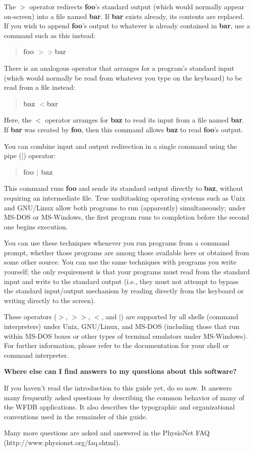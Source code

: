 \documentclass[twoside]{book}
\begin{document}
The $>$ operator redirects \textbf{foo}'s standard output (which would normally
appear on-screen) into a file named \textbf{bar}. If \textbf{bar} exists
already, its contents are replaced. If you wish to append \textbf{foo}'s output
to whatever is already contained in \textbf{bar}, use a command such as this
instead:
\begin{quote}
\textbf{foo $>>$bar}
\end{quote}

There is an analogous operator that arranges for a program's standard input
(which would normally be read from whatever you type on the keyboard) to be
read from a file instead:
\begin{quote}
\textbf{baz $<$bar}
\end{quote}

Here, the $<$ operator arranges for \textbf{baz} to read its input from a file
named \textbf{bar}. If \textbf{bar} was created by \textbf{foo}, then this
command allows \textbf{baz} to read \textbf{foo}'s output.

You can combine input and output redirection in a single command using the pipe
($|$) operator:
\begin{quote}
\textbf{foo $|$ baz}
\end{quote}

This command runs \textbf{foo} and sends its standard output directly to
\textbf{baz}, without requiring an intermediate file. True multitasking
operating systems such as Unix and GNU/Linux allow both programs to run
(apparently) simultaneously; under MS-DOS or MS-Windows, the first program runs
to completion before the second one begins execution.

You can use these techniques whenever you run programs from a command prompt,
whether those programs are among those available here or obtained from some
other source. You can use the same techniques with programs you write yourself;
the only requirement is that your programs must read from the standard input
and write to the standard output (i.e., they must not attempt to bypass the
standard input/output mechanism by reading directly from the keyboard or
writing directly to the screen).

These operators ($>$, $>>$, $<$, and $|$) are supported by all shells (command
interpreters) under Unix, GNU/Linux, and MS-DOS (including those that run
within MS-DOS boxes or other types of terminal emulators under MS-Windows). For
further information, please refer to the documentation for your shell or
command interpreter.

\vspace{5mm}
\noindent
{\large
\textbf{Where else can I find answers to my questions about this software?}}

\noindent
If you haven't read the introduction to this guide yet, do so now.  It answers
many frequently asked questions by describing the common behavior of many of
the WFDB applications.  It also describes the typographic and organizational
conventions used in the remainder of this guide.

Many more questions are asked and answered in the PhysioNet FAQ
(http://www.physionet.org/faq.shtml).
\end{document}
